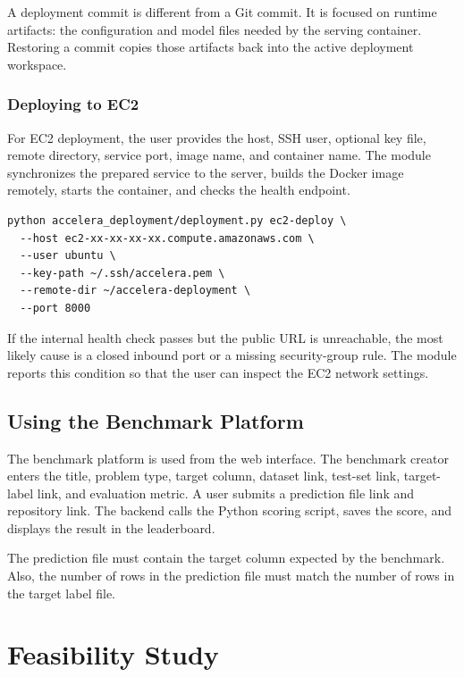 \documentclass[12pt,a4paper]{report}
\begin{document}
\noindent A deployment commit is different from a Git commit. It is focused on
runtime artifacts: the configuration and model files needed by the serving
container. Restoring a commit copies those artifacts back into the active
deployment workspace.

\subsection{Deploying to EC2}
For EC2 deployment, the user provides the host, SSH user, optional key file,
remote directory, service port, image name, and container name. The module
synchronizes the prepared service to the server, builds the Docker image
remotely, starts the container, and checks the health endpoint.

\begin{lstlisting}[style=code,caption={Deploying the service to an EC2 instance}]
python accelera_deployment/deployment.py ec2-deploy \
  --host ec2-xx-xx-xx-xx.compute.amazonaws.com \
  --user ubuntu \
  --key-path ~/.ssh/accelera.pem \
  --remote-dir ~/accelera-deployment \
  --port 8000
\end{lstlisting}

\noindent If the internal health check passes but the public URL is unreachable,
the most likely cause is a closed inbound port or a missing security-group
rule. The module reports this condition so that the user can inspect the EC2
network settings.

\section{Using the Benchmark Platform}

The benchmark platform is used from the web interface. The benchmark creator
enters the title, problem type, target column, dataset link, test-set link,
target-label link, and evaluation metric. A user submits a prediction file link
and repository link. The backend calls the Python scoring script, saves the
score, and displays the result in the leaderboard.

\noindent The prediction file must contain the target column expected by the benchmark.
Also, the number of rows in the prediction file must match the number of rows
in the target label file.

\mbox{}
\fi
\chapter{Feasibility Study}
\end{document}
